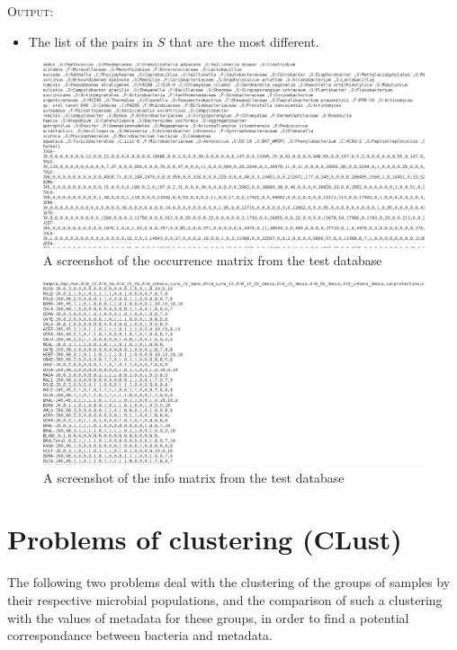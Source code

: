 \documentclass{report}
\begin{document}
\bigskip

\textsc{Output:} \begin{itemize}
                 \item The list of the pairs in $S$ that are the most different.
                 \end{itemize}

\begin{figure}[H]
\centering
\includegraphics[scale=0.3]{illustrations/occmatrix.png} 
\caption{A screenshot of the occurrence matrix from the test database}
\end{figure}

\begin{figure}[H]
\centering
\includegraphics[scale=0.3]{illustrations/infomatrix.png}
\caption{A screenshot of the info matrix from the test database}
\end{figure}

\section{Problems of clustering (CLust)}

The following two problems deal with the clustering of the groups of samples by their respective microbial populations, and the comparison of such a clustering with the values of metadata for these groups, in order to find a potential correspondance between bacteria and metadata. 
\end{document}
